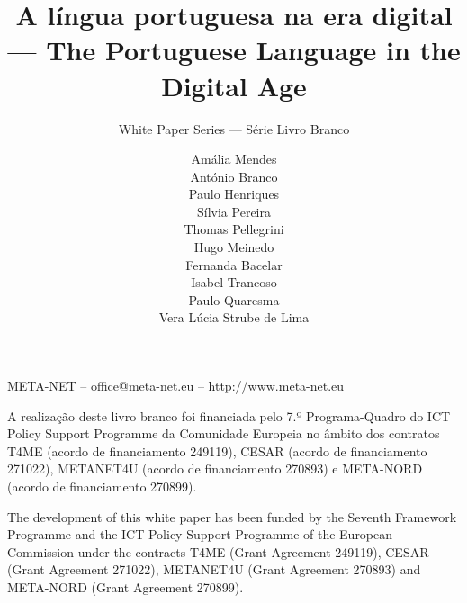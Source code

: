 \documentclass[]{../metanetpaper}
\title{A  língua \mbox{portuguesa} na era digital --- The \mbox{Portuguese} Language in the Digital Age}
\subtitle{White Paper Series --- Série Livro Branco}
\author{
  Amália Mendes \\
  António Branco \\
  Paulo Henriques \\
  Sílvia Pereira \\
  Thomas Pellegrini \\
  Hugo Meinedo \\
  Fernanda Bacelar \\
  Isabel Trancoso \\
  Paulo Quaresma \\
  Vera Lúcia Strube de Lima
}
\begin{document}
\renewcommand*{\figureformat}{\sffamily\thefigure\autodot}

\maketitle

\null
\pagestyle{empty} 

\centerline{META-NET -- office@meta-net.eu -- http://www.meta-net.eu}

\vfill

\begin{small}
  A realização deste livro branco foi financiada pelo 7.º Programa-Quadro do 
ICT Policy Support Programme da Comunidade Europeia no âmbito dos contratos 
T4ME (acordo de financiamento 249119), CESAR (acordo de financiamento 271022), 
METANET4U (acordo de financiamento 270893) e META-NORD (acordo de financiamento 270899).
\end{small}

\bigskip
\begin{small}
  The development of this white paper has been funded by the Seventh
  Framework Programme and the ICT Policy Support Programme of the
  European Commission under the contracts T4ME (Grant Agreement 249119),
  CESAR (Grant Agreement 271022), METANET4U (Grant Agreement 270893)
  and META-NORD (Grant Agreement 270899).
\end{small}

\clearpage

\setcounter{page}{5}
\pagestyle{scrheadings}

\cleardoublepage


\end{document}

